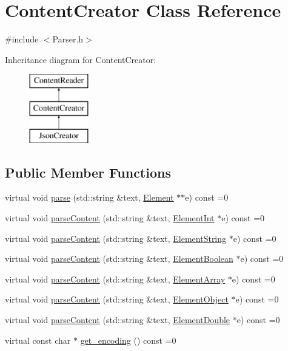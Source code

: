 \hypertarget{classContentCreator}{}\section{Content\+Creator Class Reference}
\label{classContentCreator}


{\ttfamily \#include $<$Parser.\+h$>$}

Inheritance diagram for Content\+Creator\+:\begin{figure}[H]
\begin{center}
\leavevmode
\includegraphics[height=3.000000cm]{classContentCreator}
\end{center}
\end{figure}
\subsection*{Public Member Functions}
\begin{DoxyCompactItemize}
\item 
virtual void \mbox{\hyperlink{classContentReader_a7fff2e63a2e8fa216665604f69974e1d}{parse}} (std\+::string \&text, \mbox{\hyperlink{classElement}{Element}} $\ast$$\ast$e) const =0
\item 
virtual void \mbox{\hyperlink{classContentReader_a7eef37b8b9761e21c0a3907ff94c72f7}{parse\+Content}} (std\+::string \&text, \mbox{\hyperlink{classElementInt}{Element\+Int}} $\ast$e) const =0
\item 
virtual void \mbox{\hyperlink{classContentReader_a310678ddc37a05aca2f13db73b22abe5}{parse\+Content}} (std\+::string \&text, \mbox{\hyperlink{classElementString}{Element\+String}} $\ast$e) const =0
\item 
virtual void \mbox{\hyperlink{classContentReader_a3ee0aec579c723f17742e10fe7c75e39}{parse\+Content}} (std\+::string \&text, \mbox{\hyperlink{classElementBoolean}{Element\+Boolean}} $\ast$e) const =0
\item 
virtual void \mbox{\hyperlink{classContentReader_a91fdd738983dcc7a246c3c163007dfa9}{parse\+Content}} (std\+::string \&text, \mbox{\hyperlink{classElementArray}{Element\+Array}} $\ast$e) const =0
\item 
virtual void \mbox{\hyperlink{classContentReader_a59a8de2bf3436e46b4d029a9b3c3c9da}{parse\+Content}} (std\+::string \&text, \mbox{\hyperlink{classElementObject}{Element\+Object}} $\ast$e) const =0
\item 
virtual void \mbox{\hyperlink{classContentReader_ab4ba739ee5241848ae8af86e64e43a40}{parse\+Content}} (std\+::string \&text, \mbox{\hyperlink{classElementDouble}{Element\+Double}} $\ast$e) const =0
\item 
virtual const char $\ast$ \mbox{\hyperlink{classContentReader_a1495a4402c4fac02d8cd2542b61c6eed}{get\+\_\+encoding}} () const =0
\end{DoxyCompactItemize}


